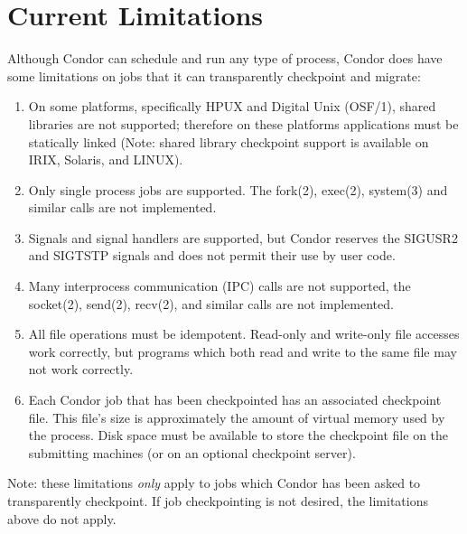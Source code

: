 \section{\label{sec:current-limitations}Current Limitations}

\begin{description}

	\item[Limitations on Jobs which can Checkpointed] Although Condor can schedule and
run any type of process, Condor does have some limitations on jobs that it can
transparently checkpoint and migrate:
\begin{enumerate}
	\item On some platforms, specifically HPUX 
and Digital Unix
(OSF/1),
shared libraries are not supported; therefore on these
platforms applications must be statically linked (Note: shared library
checkpoint support is available on IRIX, Solaris, and LINUX). 
	\item Only single process jobs are supported. The fork(2),
exec(2),
system(3)
and similar calls are not implemented.
	\item Signals and signal handlers 
are supported, but Condor reserves the 
SIGUSR2 and SIGTSTP signals and does not permit their use by user code.
	\item Many interprocess communication (IPC) calls are not supported,
the socket(2),
send(2),
recv(2),
and similar calls are not implemented.
	\item All file operations must be idempotent.
Read-only and write-only file accesses work correctly,
but programs which both read and write to the same file may not
work correctly.
	\item Each Condor job that has been checkpointed has an associated 
checkpoint file.
This file's size is approximately the amount of virtual memory used by the 
process. Disk space must be available to store the checkpoint file on the 
submitting machines (or on an optional checkpoint server).
\end{enumerate}

	Note: these limitations \emph{only} apply to jobs which Condor
has been asked to transparently checkpoint.  If job checkpointing is not
desired, the limitations above do not apply.


\end{description}
